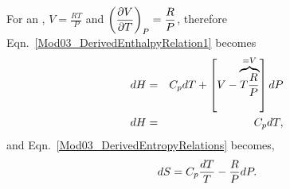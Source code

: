 \medskip

\begin{shaded}
      \noindent
      For an , $V=\frac{RT}{P}$ and $\Partial[V]{T}{P} = \frc{R}{P}$, therefore Eqn.~\ref{Mod03_DerivedEnthalpyRelation1} becomes
         \begin{eqnarray}
            dH &=& C_{p}dT + \left[V-\overbrace{T\frc{R}{P}}^{=V}\right]dP \nonumber \\
            dH &=& C_{p}dT,\label{Mod03_DerivedEnthalpyRelation2}
         \end{eqnarray}
      and Eqn.~\ref{Mod03_DerivedEntropyRelations} becomes,
         \begin{equation}
            dS = C_{p}\frc{dT}{T} -\frc{R}{P}dP.\label{Mod03_DerivedEntropyRelations2}
         \end{equation}
\end{shaded}

\bigskip

